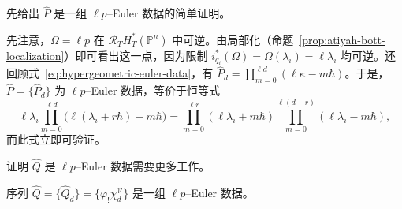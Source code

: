 先给出 $\widehat P$ 是一组 $\ell p$--Euler 数据的简单证明。
\begin{example}\label{ex:hypergeometric-euler-data-gluing}
先注意，$\Omega=\ell p$ 在 $\mathcal R_TH_T^*(\mathbb P^n)$ 中可逆。由局部化（命题~\ref{prop:atiyah-bott-localization}）即可看出这一点，因为限制 $i_{q_i}^*(\Omega)=\Omega(\lambda_i)=\ell\lambda_i$ 均可逆。还回顾式~\eqref{eq:hypergeometric-euler-data}，有 $\widehat P_d=\prod_{m=0}^{\ell d}(\ell\kappa-m\hbar)$。于是，$\widehat P=\{\widehat P_d\}$ 为 $\ell p$--Euler 数据，等价于恒等式
\[
\ell\lambda_i\prod_{m=0}^{\ell d}\bigl(\ell(\lambda_i+r\hbar)-m\hbar\bigr)
=\prod_{m=0}^{\ell r}(\ell\lambda_i+m\hbar)
\prod_{m=0}^{\ell(d-r)}(\ell\lambda_i-m\hbar),
\]
而此式立即可验证。
\end{example}
证明 $\widehat Q$ 是 $\ell p$--Euler 数据需要更多工作。
\begin{theorem}\label{thm:geometric-euler-data-gluing}
序列 $\widehat Q=\{\widehat Q_d\}=\{\varphi_!\chi_d^{\mathcal V}\}$ 是一组 $\ell p$--Euler 数据。
\end{theorem}
